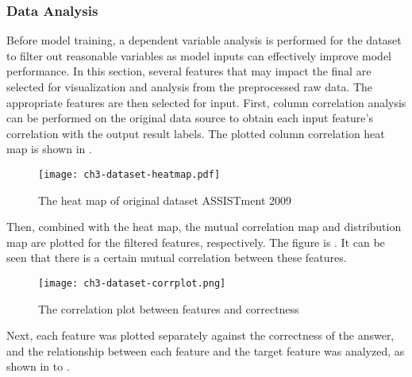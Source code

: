 \subsubsection{Data Analysis}
Before model training, a dependent variable analysis is performed for the dataset to filter out reasonable variables as model inputs can effectively improve model performance. In this section, several features that may impact the final are selected for visualization and analysis from the preprocessed raw data. The appropriate features are then selected for input.
First, column correlation analysis can be performed on the original data source to obtain each input feature's correlation with the output result labels. The plotted column correlation heat map is shown in \figname{\ref{fig:ch3-dataset-heatmap}}.

\begin{figure}[htb]
    \centering
    \texttt{[image: ch3-dataset-heatmap.pdf]}
    \caption{The heat map of original dataset ASSISTment 2009}\label{fig:ch3-dataset-heatmap}
\end{figure}

Then, combined with the heat map, the mutual correlation map and distribution map are plotted for the filtered features, respectively. The figure is \figname{\ref{fig:ch3-dataset-corrplot}}. It can be seen that there is a certain mutual correlation between these features.
\begin{figure}[htbp!]
    \centering
    \texttt{[image: ch3-dataset-corrplot.png]}
    \caption{The correlation plot between features and correctness}\label{fig:ch3-dataset-corrplot}
\end{figure}


Next, each feature was plotted separately against the correctness of the answer, and the relationship between each feature and the target feature was analyzed, as shown in \figname{\ref{fig:ch3-jointplot-hc}} to \figname{\ref{fig:ch3-jointplot-atc}}.

